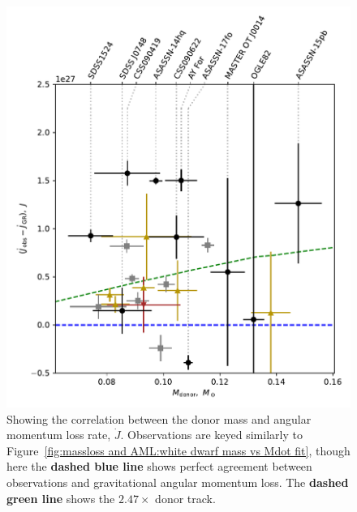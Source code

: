 \begin{figure}
    \centering
    \includegraphics[width=\textwidth]{figures/results/Mdot/Mr_Jdot_nofit.pdf}
    \caption{Showing the correlation between the donor mass and angular momentum loss rate, $\dot J$. Observations are keyed similarly to Figure~\ref{fig:massloss and AML:white dwarf mass vs Mdot fit}, though here the {\bf dashed blue line} shows perfect agreement between observations and gravitational angular momentum loss. The {\bf dashed green line} shows the $2.47\times$ donor track.}
    \label{fig:massloss and AML:donor mass vs Jdot fit}
\end{figure}
